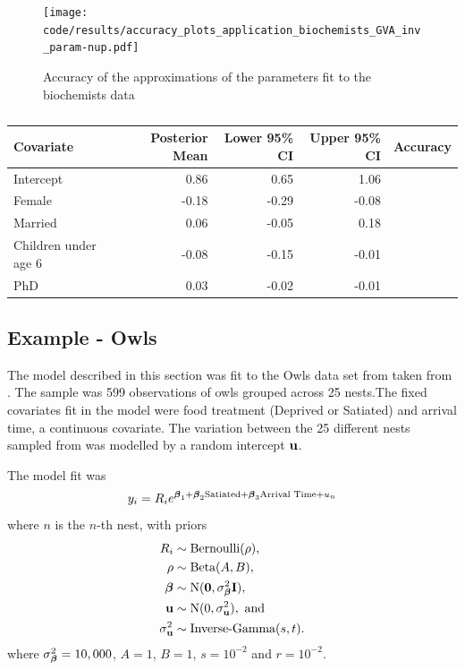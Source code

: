 			\begin{figure}
			\texttt{[image: code/results/accuracy\_plots\_application\_biochemists\_GVA\_inv\_param-nup.pdf]}
			\label{fig:biochemists}
			\caption{Accuracy of the approximations of the parameters fit to the biochemists data}
			\end{figure}

			\begin{table}
				\begin{tabular}{|l|rrrr|}
					\hline
					Covariate          & Posterior Mean & Lower 95\% CI & Upper 95\% CI & Accuracy \\
					\hline
					Intercept & 0.86 & 0.65 & 1.06 & \\
					Female & -0.18 & -0.29 & -0.08 &  \\
					Married & 0.06 & -0.05 & 0.18 & \\
					Children under age 6 & -0.08 & -0.15 & -0.01 & \\
					PhD & 0.03 & -0.02 & -0.01 & \\
					\hline
				\end{tabular}			
				\label{tab:biochemists_results}
				\caption{}
			\end{table}
			
			\subsection{Example - Owls}
			The model described in this section was fit to the Owls data set from taken from \cite{zuur_mixed_2009}.
			The sample was 599 observations of owls grouped across 25 nests.The fixed covariates
			fit in the model were food treatment (Deprived or Satiated) and arrival time, a continuous covariate.
			The variation between the 25 different nests sampled from was modelled by a random intercept
			${\bf u}$.

			The model fit was
			\[
			y_i = R_i e^{{\boldsymbol \beta}_1 + {\boldsymbol \beta}_2 \text{Satiated} + {\boldsymbol \beta}_3 \text{Arrival Time} + u_n}
			\]
			where $n$ is the $n$-th nest, with priors
			\begin{align*}
			R_i &\sim \text{Bernoulli}(\rho), \\
			\rho &\sim \text{Beta}(A, B), \\
			{\boldsymbol \beta} &\sim \text{N}({\bf 0}, \sigma_{\boldsymbol \beta}^2 {\bf I}), \\
			{\bf u} &\sim \text{N}(0, \sigma_{\bf u}^2), \text { and } \\
			\sigma_{\bf u}^2 &\sim \text{Inverse-Gamma}(s, t).
			\end{align*}
			where $\sigma_{\boldsymbol \beta}^2=10,000$, $A=1$, $B=1$, $s=10^{-2}$ and $r=10^{-2}$.

